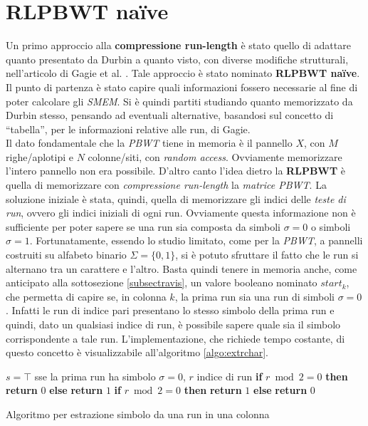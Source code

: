 \section{RLPBWT na\"{i}ve}
\label{secrlpbwtnaive}
Un primo approccio alla \textbf{compressione run-length} è stato quello di
adattare quanto presentato da Durbin \cite{pbwt} a quanto visto, con diverse
modifiche strutturali, nell'articolo di
Gagie et al. \cite{tricks}. Tale approccio è stato nominato \textbf{RLPBWT
  na\"{i}ve}.\\ 
Il punto di partenza è stato capire quali informazioni fossero necessarie al
fine di poter calcolare gli \textit{SMEM}. Si è quindi partiti studiando quanto
memorizzato da Durbin stesso, pensando ad eventuali alternative, basandosi sul
concetto di ``tabella'', per le informazioni relative alle run, di Gagie.\\
Il dato fondamentale che la \textit{PBWT} tiene in memoria è il pannello
$X$, con $M$ righe/aplotipi e $N$ colonne/siti, con \textit{random
  access}. Ovviamente memorizzare l'intero pannello non era 
possibile. D'altro canto l'idea dietro la 
\textbf{RLPBWT} è quella di memorizzare con \textit{compressione run-length}
la \textit{matrice PBWT}. La soluzione iniziale è stata, quindi, quella di
memorizzare gli indici delle \textit{teste di run}, ovvero gli indici iniziali
di ogni run. Ovviamente questa informazione non è sufficiente per poter sapere
se una run sia composta da simboli $\sigma=0$ o simboli
$\sigma=1$. Fortunatamente, essendo lo studio limitato, come per la
\textit{PBWT}, a pannelli costruiti su alfabeto binario $\Sigma=\{0,1\}$, si è
potuto sfruttare il fatto che le run si alternano tra un carattere e
l'altro. Basta quindi tenere in memoria anche, come
anticipato alla sottosezione \ref{subsectravis}, un valore booleano nominato
$start_k$, che permetta di 
capire se, in colonna $k$, la prima run sia una run di simboli
$\sigma=0$. Infatti le run di 
indice pari presentano lo stesso simbolo della prima run e quindi, dato un
qualsiasi indice di run, è possibile sapere quale sia il simbolo corrispondente
a tale run. L'implementazione, che richiede tempo costante, di questo concetto è
visualizzabile all'algoritmo \ref{algo:extrchar}.
\begin{algorithm}
  \footnotesize
  \begin{algorithmic}[1]
    \Comment $s=\top$ sse la prima run ha simbolo $\sigma=0$, $r$ indice di run
    \State \textbf{if} $r\bmod 2 = 0$ \textbf{then} \textbf{return} $0$
    \textbf{else} \textbf{return} $1$
    \Else
    \State \textbf{if} $r\bmod 2 = 0$ \textbf{then} \textbf{return} $1$
    \textbf{else} \textbf{return} $0$
    \EndIf
    \EndFunction
  \end{algorithmic}
  \caption{Algoritmo per estrazione simbolo da una run in una colonna}
  \label{algo:extrchar}
\end{algorithm}

